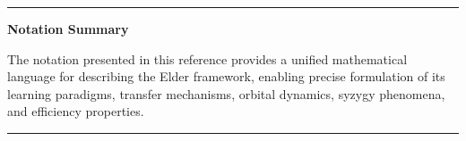 \clearpage
\begin{center}
\rule{0.8\textwidth}{0.5pt}

\vspace{1cm}
{\Large \textbf{Notation Summary}}
\vspace{0.5cm}

The notation presented in this reference provides a unified mathematical language for describing the Elder framework, enabling precise formulation of its learning paradigms, transfer mechanisms, orbital dynamics, syzygy phenomena, and efficiency properties.

\vspace{0.5cm}
\rule{0.8\textwidth}{0.5pt}
\end{center}